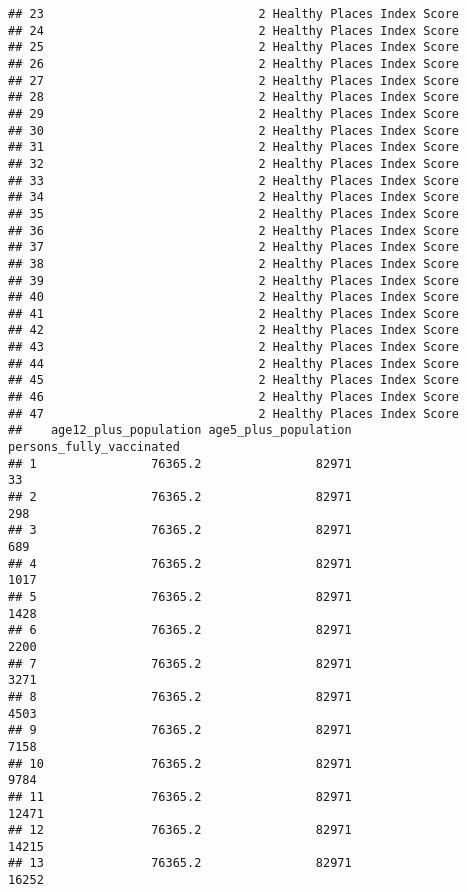 \documentclass[
]{article}
\begin{document}
\begin{verbatim}
## 23                              2 Healthy Places Index Score
## 24                              2 Healthy Places Index Score
## 25                              2 Healthy Places Index Score
## 26                              2 Healthy Places Index Score
## 27                              2 Healthy Places Index Score
## 28                              2 Healthy Places Index Score
## 29                              2 Healthy Places Index Score
## 30                              2 Healthy Places Index Score
## 31                              2 Healthy Places Index Score
## 32                              2 Healthy Places Index Score
## 33                              2 Healthy Places Index Score
## 34                              2 Healthy Places Index Score
## 35                              2 Healthy Places Index Score
## 36                              2 Healthy Places Index Score
## 37                              2 Healthy Places Index Score
## 38                              2 Healthy Places Index Score
## 39                              2 Healthy Places Index Score
## 40                              2 Healthy Places Index Score
## 41                              2 Healthy Places Index Score
## 42                              2 Healthy Places Index Score
## 43                              2 Healthy Places Index Score
## 44                              2 Healthy Places Index Score
## 45                              2 Healthy Places Index Score
## 46                              2 Healthy Places Index Score
## 47                              2 Healthy Places Index Score
##    age12_plus_population age5_plus_population persons_fully_vaccinated
## 1                76365.2                82971                       33
## 2                76365.2                82971                      298
## 3                76365.2                82971                      689
## 4                76365.2                82971                     1017
## 5                76365.2                82971                     1428
## 6                76365.2                82971                     2200
## 7                76365.2                82971                     3271
## 8                76365.2                82971                     4503
## 9                76365.2                82971                     7158
## 10               76365.2                82971                     9784
## 11               76365.2                82971                    12471
## 12               76365.2                82971                    14215
## 13               76365.2                82971                    16252

\end{verbatim}
\end{document}
